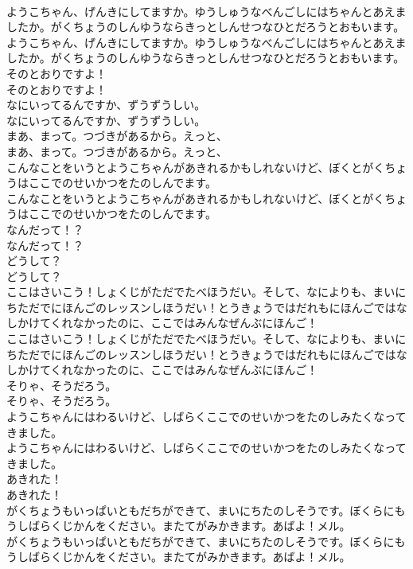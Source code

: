 \documentclass[8pt]{extreport}
\begin{document}
\begin{CJK}{UTF8}{min}
\\	ようこちゃん、げんきにしてますか。ゆうしゅうなべんごしにはちゃんとあえましたか。がくちょうのしんゆうならきっとしんせつなひとだろうとおもいます。
\\	ようこちゃん、げんきにしてますか。ゆうしゅうなべんごしにはちゃんとあえましたか。がくちょうのしんゆうならきっとしんせつなひとだろうとおもいます。
\\	そのとおりですよ！
\\	そのとおりですよ！
\\	なにいってるんですか、ずうずうしい。
\\	なにいってるんですか、ずうずうしい。
\\	まあ、まって。つづきがあるから。えっと、
\\	まあ、まって。つづきがあるから。えっと、
\\	こんなことをいうとようこちゃんがあきれるかもしれないけど、ぼくとがくちょうはここでのせいかつをたのしんでます。
\\	こんなことをいうとようこちゃんがあきれるかもしれないけど、ぼくとがくちょうはここでのせいかつをたのしんでます。
\\	なんだって！？
\\	なんだって！？
\\	どうして？
\\	どうして？
\\	ここはさいこう！しょくじがただでたべほうだい。そして、なによりも、まいにちただでにほんごのレッスンしほうだい！とうきょうではだれもにほんごではなしかけてくれなかったのに、ここではみんなぜんぶにほんご！
\\	ここはさいこう！しょくじがただでたべほうだい。そして、なによりも、まいにちただでにほんごのレッスンしほうだい！とうきょうではだれもにほんごではなしかけてくれなかったのに、ここではみんなぜんぶにほんご！
\\	そりゃ、そうだろう。
\\	そりゃ、そうだろう。
\\	ようこちゃんにはわるいけど、しばらくここでのせいかつをたのしみたくなってきました。
\\	ようこちゃんにはわるいけど、しばらくここでのせいかつをたのしみたくなってきました。
\\	あきれた！
\\	あきれた！
\\	がくちょうもいっぱいともだちができて、まいにちたのしそうです。ぼくらにもうしばらくじかんをください。またてがみかきます。あばよ！メル。
\\	がくちょうもいっぱいともだちができて、まいにちたのしそうです。ぼくらにもうしばらくじかんをください。またてがみかきます。あばよ！メル。

\end{CJK}
\end{document}
